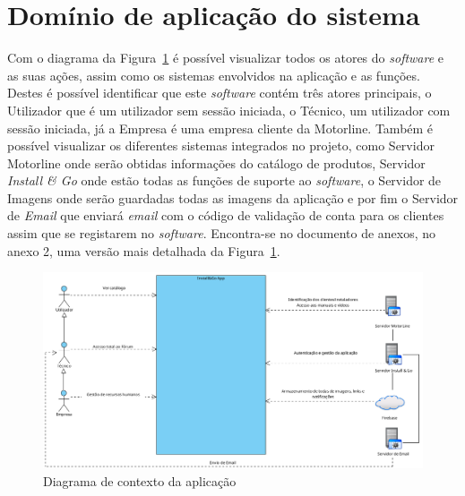 \section{Domínio de aplicação do sistema}

Com o diagrama da Figura~\ref{fig:2} é possível visualizar todos os atores do \textit{software} e as suas ações, assim como os sistemas envolvidos na aplicação e as funções.
Destes é possível identificar que este \textit{software} contém três atores principais, o Utilizador que é um utilizador sem sessão iniciada, o Técnico, um utilizador com sessão iniciada, já a Empresa é uma empresa cliente da Motorline. Também é possível visualizar os diferentes sistemas integrados no projeto, como Servidor Motorline onde serão obtidas informações do catálogo de produtos, Servidor \textit{Install \& Go} onde estão todas as funções de suporte ao \textit{software}, o Servidor de Imagens onde serão guardadas todas as imagens da aplicação e por fim o Servidor de \textit{Email} que enviará \textit{email} com o código de validação de conta para os clientes assim que se registarem no \textit{software}. Encontra-se no documento de anexos, no anexo 2, uma versão mais detalhada da Figura~\ref*{fig:2}.


\begin{figure}[htb]
  \centering
  
  \includegraphics[width=\textwidth]{images/diagramas/diagrama_contexto.png}
  \caption{Diagrama de contexto da aplicação}
  \label{fig:2}
\end{figure}